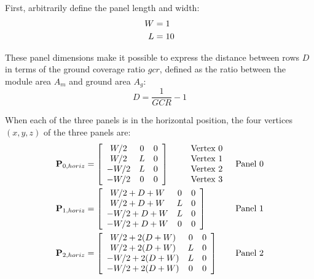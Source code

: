 \documentclass[12pt,letterpaper]{article}
\begin{document}
First, arbitrarily define the panel length and width:
\begin{align}\label{eqn_paneldim}
W&=1\notag\\
L&=10
\end{align}

These panel dimensions make it possible to express the distance between rows $D$ in terms of the ground coverage ratio $\mathit{gcr}$, defined as the ratio between the module area $A_m$ and ground area $A_g$:
\begin{equation}
D=\frac{1}{\mathit{GCR}}-1
\end{equation}


When each of the three panels is in the horizontal position, the four vertices $(x,y,z)$ of the three panels are:
\begin{align}
\mathbf{P}_{0,horiz} &= 
  \left [
    \begin{array}{ccc}
      W/2&0&0\\
      W/2&L&0\\
      -W/2&L&0\\
      -W/2&0&0\\
    \end{array}
  \right] 
    \begin{array}{ccc}
      &&\text{Vertex 0}\\
     &&\text{Vertex 1}\\
     &&\text{Vertex 2}\\
     &&\text{Vertex 3}\\
    \end{array}&\text{Panel 0}
\notag\\
\mathbf{P}_{1,horiz} &= 
  \left [
    \begin{array}{ccc}
      W/2+D+W&0&0\\
      W/2+D+W&L&0\\
      -W/2+D+W&L&0\\
      -W/2+D+W&0&0\\
    \end{array}
  \right]&\text{Panel 1}
\notag\\
\mathbf{P}_{2,horiz} &= 
  \left [
    \begin{array}{ccc}
      W/2+2(D+W)&0&0\\
      W/2+2(D+W)&L&0\\
      -W/2+2(D+W)&L&0\\
      -W/2+2(D+W)&0&0\\
    \end{array}
  \right]&\text{Panel 2}
\end{align}
\end{document}
